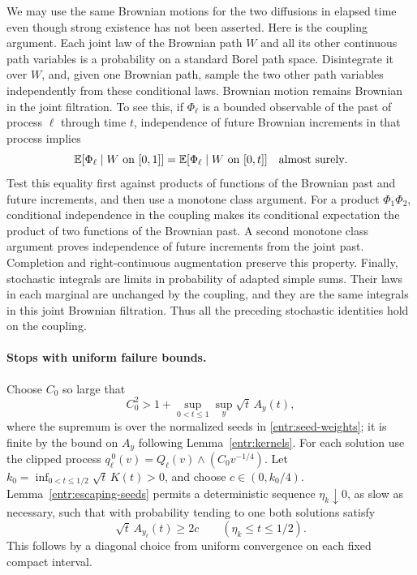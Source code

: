 We may use the same Brownian motions for the two diffusions in elapsed
time even though strong existence has not been asserted.  Here is the
coupling argument.  Each joint law of the Brownian path \(W\) and all
its other continuous path variables is a probability on a standard
Borel path space.  Disintegrate it over \(W\), and, given one Brownian
path, sample the two other path variables independently from these
conditional laws.  Brownian motion remains Brownian in the joint
filtration.  To see this, if \(\Phi_\ell\) is a bounded observable of the
past of process \(\ell\) through time \(t\), independence of future
Brownian increments in that process implies
\[
 \mathbb E[\Phi_\ell\mid W\text{ on }[0,1]]
   =\mathbb E[\Phi_\ell\mid W\text{ on }[0,t]]
 \quad\text{almost surely}.
\]
Test this equality first against products of functions of the Brownian
past and future increments, and then use a monotone class argument.
For a product \(\Phi_1\Phi_2\), conditional independence in the coupling
makes its conditional expectation the product of two functions of the
Brownian past.  A second monotone class argument proves independence
of future increments from the joint past.  Completion and
right-continuous augmentation preserve this property.  Finally,
stochastic integrals are limits in probability of adapted simple
sums.  Their laws in each marginal are unchanged by the coupling,
and they are the same integrals in this joint Brownian filtration.
Thus all the preceding stochastic identities hold on the coupling.

\paragraph{Stops with uniform failure bounds.}
Choose \(C_0\) so large that
\[
 C_0^2>1+\sup_{0<t\le1}\sup_y\sqrt t\,A_y(t),
\]
where the supremum is over the normalized seeds in
\eqref{entr:seed-weights}; it is finite by the bound on \(A_y\)
following Lemma~\ref{entr:kernels}.  For each solution use the clipped process
\(q_\ell^{\,0}(v)=Q_\ell(v)\wedge(C_0v^{-1/4})\).
Let \(k_0=\inf_{0<t\le1/2}\sqrt t\,K(t)>0\), and choose
\(c\in(0,k_0/4)\).  Lemma~\ref{entr:escaping-seeds} permits a
deterministic sequence \(\eta_k\downarrow0\), as slow as necessary,
such that with probability tending to one both solutions satisfy
\begin{equation}\label{entr:seed-lower}
 \sqrt t\,A_{y_\ell}(t)\ge2c
             \qquad(\eta_k\le t\le1/2).
\end{equation}
This follows by a diagonal choice from uniform convergence on each
fixed compact interval.

